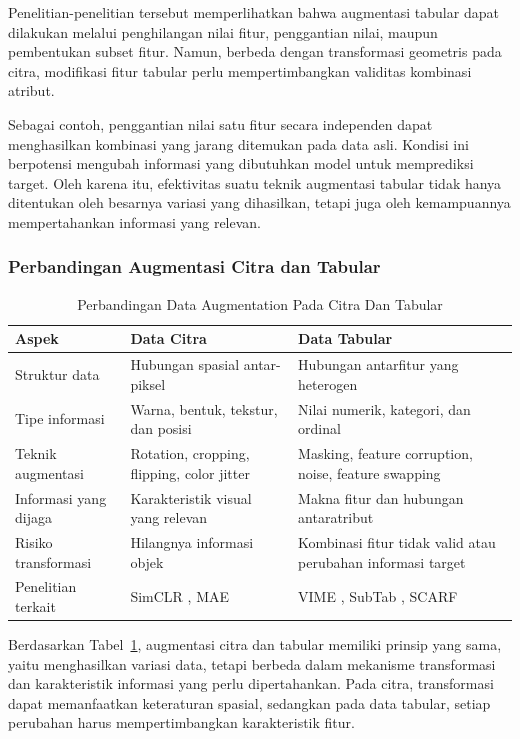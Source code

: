 Penelitian-penelitian tersebut memperlihatkan bahwa augmentasi tabular dapat dilakukan melalui penghilangan nilai fitur, penggantian nilai, maupun pembentukan subset fitur. Namun, berbeda dengan transformasi geometris pada citra, modifikasi fitur tabular perlu mempertimbangkan validitas kombinasi atribut.

Sebagai contoh, penggantian nilai satu fitur secara independen dapat menghasilkan kombinasi yang jarang ditemukan pada data asli. Kondisi ini berpotensi mengubah informasi yang dibutuhkan model untuk memprediksi target. Oleh karena itu, efektivitas suatu teknik augmentasi tabular tidak hanya ditentukan oleh besarnya variasi yang dihasilkan, tetapi juga oleh kemampuannya mempertahankan informasi yang relevan.

\subsubsection{Perbandingan Augmentasi Citra dan Tabular}

\begin{table}[!t]
\caption{Perbandingan Data Augmentation Pada Citra Dan Tabular}
\label{tab:i}
\centering
\footnotesize
\renewcommand{\arraystretch}{1.15}
\begin{tabularx}{\textwidth}{XXX}
\hline
\textbf{Aspek} & \textbf{Data Citra} & \textbf{Data Tabular} \\
\hline
Struktur data & Hubungan spasial antar-piksel & Hubungan antarfitur yang heterogen \\
Tipe informasi & Warna, bentuk, tekstur, dan posisi & Nilai numerik, kategori, dan ordinal \\
Teknik augmentasi & Rotation, cropping, flipping, color jitter & Masking, feature corruption, noise, feature swapping \\
Informasi yang dijaga & Karakteristik visual yang relevan & Makna fitur dan hubungan antaratribut \\
Risiko transformasi & Hilangnya informasi objek & Kombinasi fitur tidak valid atau perubahan informasi target \\
Penelitian terkait & SimCLR \cite{ref2}, MAE \cite{ref3} & VIME \cite{ref5}, SubTab \cite{ref6}, SCARF \cite{ref7} \\
\hline
\end{tabularx}
\end{table}

Berdasarkan Tabel~\ref{tab:i}, augmentasi citra dan tabular memiliki prinsip yang sama, yaitu menghasilkan variasi data, tetapi berbeda dalam mekanisme transformasi dan karakteristik informasi yang perlu dipertahankan. Pada citra, transformasi dapat memanfaatkan keteraturan spasial, sedangkan pada data tabular, setiap perubahan harus mempertimbangkan karakteristik fitur.

